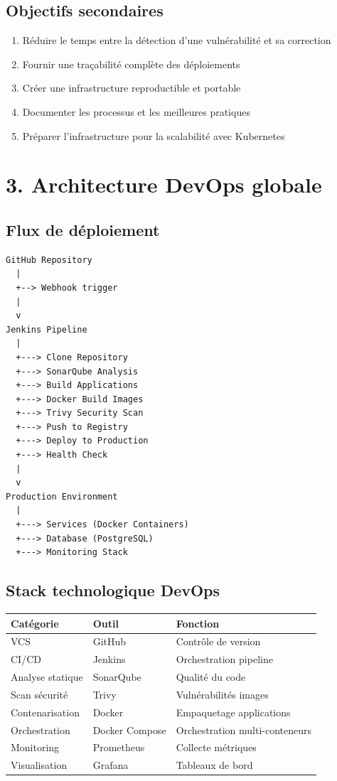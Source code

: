\documentclass[12pt,a4paper]{report}
\begin{document}
\subsection{Objectifs secondaires}

\begin{enumerate}
    \item Réduire le temps entre la détection d'une vulnérabilité et sa correction
    \item Fournir une traçabilité complète des déploiements
    \item Créer une infrastructure reproductible et portable
    \item Documenter les processus et les meilleures pratiques
    \item Préparer l'infrastructure pour la scalabilité avec Kubernetes
\end{enumerate}

\section{3. Architecture DevOps globale}

\subsection{Flux de déploiement}

\begin{verbatim}
GitHub Repository
  |
  +--> Webhook trigger
  |
  v
Jenkins Pipeline
  |
  +---> Clone Repository
  +---> SonarQube Analysis
  +---> Build Applications
  +---> Docker Build Images
  +---> Trivy Security Scan
  +---> Push to Registry
  +---> Deploy to Production
  +---> Health Check
  |
  v
Production Environment
  |
  +---> Services (Docker Containers)
  +---> Database (PostgreSQL)
  +---> Monitoring Stack
\end{verbatim}

\subsection{Stack technologique DevOps}

\begin{table}[h]
\centering
\begin{tabular}{|l|l|l|}
\hline
\textbf{Catégorie} & \textbf{Outil} & \textbf{Fonction} \\
\hline
VCS & GitHub & Contrôle de version \\
CI/CD & Jenkins & Orchestration pipeline \\
Analyse statique & SonarQube & Qualité du code \\
Scan sécurité & Trivy & Vulnérabilités images \\
Contenarisation & Docker & Empaquetage applications \\
Orchestration & Docker Compose & Orchestration multi-conteneurs \\
Monitoring & Prometheus & Collecte métriques \\
Visualisation & Grafana & Tableaux de bord \\
\hline
\end{tabular}
\end{table}
\end{document}
